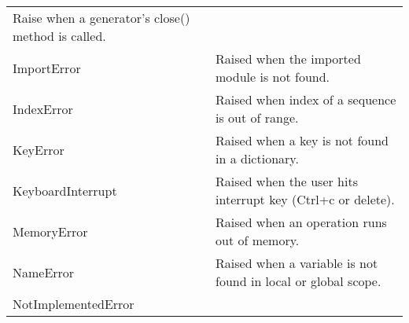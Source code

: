 \documentclass[11pt]{article}
\begin{document}
\begin{longtable}[]{@{}ll@{}}
\begin{minipage}[t]{0.79\columnwidth}
Raise when a generator's close() method is called.\strut
\end{minipage}\tabularnewline
\begin{minipage}[t]{0.15\columnwidth}\raggedright\strut
ImportError\strut
\end{minipage} & \begin{minipage}[t]{0.79\columnwidth}\raggedright\strut
Raised when the imported module is not found.\strut
\end{minipage}\tabularnewline
\begin{minipage}[t]{0.15\columnwidth}\raggedright\strut
IndexError\strut
\end{minipage} & \begin{minipage}[t]{0.79\columnwidth}\raggedright\strut
Raised when index of a sequence is out of range.\strut
\end{minipage}\tabularnewline
\begin{minipage}[t]{0.15\columnwidth}\raggedright\strut
KeyError\strut
\end{minipage} & \begin{minipage}[t]{0.79\columnwidth}\raggedright\strut
Raised when a key is not found in a dictionary.\strut
\end{minipage}\tabularnewline
\begin{minipage}[t]{0.15\columnwidth}\raggedright\strut
KeyboardInterrupt\strut
\end{minipage} & \begin{minipage}[t]{0.79\columnwidth}\raggedright\strut
Raised when the user hits interrupt key (Ctrl+c or delete).\strut
\end{minipage}\tabularnewline
\begin{minipage}[t]{0.15\columnwidth}\raggedright\strut
MemoryError\strut
\end{minipage} & \begin{minipage}[t]{0.79\columnwidth}\raggedright\strut
Raised when an operation runs out of memory.\strut
\end{minipage}\tabularnewline
\begin{minipage}[t]{0.15\columnwidth}\raggedright\strut
NameError\strut
\end{minipage} & \begin{minipage}[t]{0.79\columnwidth}\raggedright\strut
Raised when a variable is not found in local or global scope.\strut
\end{minipage}\tabularnewline
\begin{minipage}[t]{0.15\columnwidth}\raggedright\strut
NotImplementedError\strut

\end{minipage}
\end{longtable}
\end{document}
